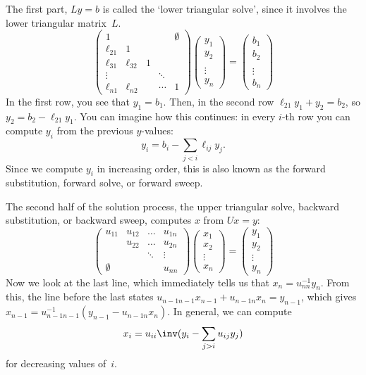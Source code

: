 The first part, $Ly=b$ is called the `lower triangular solve', since
it involves the lower triangular matrix~$L$.
  \[ \left(
    \begin{matrix}
      1&&&&\emptyset\\ \ell_{21}&1\\ \ell_{31}&\ell_{32}&1\\
      \vdots&&&\ddots\\ \ell_{n1}&\ell_{n2}&&\cdots&1
    \end{matrix}\right) \left(
    \begin{matrix}
      y_1\\ y_2\\ \\ \vdots\\ y_n
    \end{matrix}\right) = \left(
    \begin{matrix}
      b_1\\ b_2\\ \\ \vdots\\ b_n
    \end{matrix}\right)
  \]
In the first row, you see that $y_1=b_1$. Then, in the second row
$\ell_{21}y_1+y_2=b_2$, so $y_2=b_2-\ell_{21}y_1$. You can imagine how
this continues: in every $i$-th row you can compute $y_i$ from the
previous $y$-values:
\[ y_i = b_i-\sum_{j<i} \ell_{ij}y_j. \]
Since we compute $y_i$ in increasing order, this is also known as
the forward substitution, forward solve, or forward sweep.
  

The second half of the solution process, the upper triangular solve,
backward substitution, or backward sweep, computes $x$ from $Ux=y$:
  \[ \left(
    \begin{matrix}
      u_{11}&u_{12}&\ldots&u_{1n}\\ &u_{22}&\ldots&u_{2n}\\
      &&\ddots&\vdots\\ \emptyset&&&u_{nn}
    \end{matrix}\right) \left(
    \begin{matrix}
      x_1\\ x_2\\ \vdots\\ x_n
    \end{matrix}\right)=\left(
    \begin{matrix}
      y_1\\ y_2\\ \vdots\\ y_n
    \end{matrix}\right)
  \]
Now we look at the last line, which immediately tells us that
$x_n=u_{nn}^{-1}y_n$.
From this, the line before the last states
$u_{n-1n-1}x_{n-1}+u_{n-1n}x_n=y_{n-1}$, which gives
$x_{n-1}=u_{n-1n-1}^{-1}(y_{n-1}-u_{n-1n}x_n)$.
In general, we can compute
\[ x_i=u_{ii}\inv (y_i-\sum_{j>i}u_{ij}y_j) \]
for decreasing values of~$i$.

